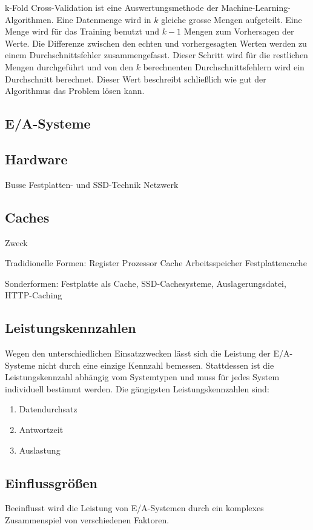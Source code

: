 k-Fold Cross-Validation ist eine Auswertungsmethode der Machine-Learning-Algorithmen. Eine Datenmenge wird in $k$ gleiche grosse Mengen aufgeteilt. Eine Menge wird für das Training benutzt und $k-1$ Mengen zum Vorhersagen der Werte. Die Differenze zwischen den echten und vorhergesagten Werten werden zu einem Durchschnittsfehler zusammengefasst. Dieser Schritt wird für die restlichen Mengen durchgeführt und von den $k$ berechnenten Durchschnittsfehlern wird ein Durchschnitt berechnet. Dieser Wert beschreibt schließlich wie gut der Algorithmus das Problem lösen kann.

\subsection{E/A-Systeme}


\subsection{Hardware}
Busse
Festplatten- und SSD-Technik
Netzwerk


\subsection{Caches}
Zweck

Tradidionelle Formen:
Register
Prozessor Cache
Arbeitsspeicher
Festplattencache

Sonderformen: Festplatte als Cache, SSD-Cachesysteme, Auslagerungsdatei, HTTP-Caching


\subsection{Leistungskennzahlen}
Wegen den unterschiedlichen Einsatzzwecken lässt sich die Leistung der E/A-Systeme nicht durch eine einzige Kennzahl bemessen. Stattdessen ist die Leistungskennzahl abhängig vom Systemtypen und muss für jedes System individuell bestimmt werden. Die gängigsten Leistungskennzahlen sind:
\begin{enumerate}
	\item Datendurchsatz
	\item Antwortzeit
	\item Auslastung
\end{enumerate}


\subsection{Einflussgrößen}
Beeinflusst wird die Leistung von E/A-Systemen durch ein komplexes Zusammenspiel von verschiedenen Faktoren.


